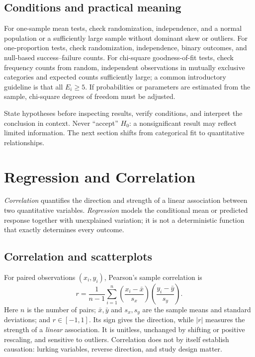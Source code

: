 \documentclass[11pt]{article}
\begin{document}
\subsection{Conditions and practical meaning}
For one-sample mean tests, check randomization, independence, and a normal
population or a sufficiently large sample without dominant skew or outliers.
For one-proportion tests, check randomization, independence, binary outcomes,
and null-based success--failure counts.  For chi-square goodness-of-fit tests,
check frequency counts from random, independent observations in mutually
exclusive categories and expected counts sufficiently large; a common
introductory guideline is that all $E_i\ge5$.  If probabilities or parameters
are estimated from the sample, chi-square degrees of freedom must be adjusted.

\begin{keybox}
State hypotheses before inspecting results, verify conditions, and interpret
the conclusion in context.  Never ``accept'' $H_0$: a nonsignificant result
may reflect limited information.  The next section shifts from categorical
fit to quantitative relationships.
\end{keybox}

\section{Regression and Correlation}\label{sec:regression}
\emph{Correlation} quantifies the direction and strength of a linear
association between two quantitative variables.  \emph{Regression} models the
conditional mean or predicted response together with unexplained variation;
it is not a deterministic function that exactly determines every outcome.

\subsection{Correlation and scatterplots}
For paired observations $(x_i,y_i)$, Pearson's sample correlation is
\begin{equation}\label{eq:r}
r=\frac{1}{n-1}\sum_{i=1}^{n}
\left(\frac{x_i-\bar{x}}{s_x}\right)
\left(\frac{y_i-\bar{y}}{s_y}\right).
\end{equation}
Here $n$ is the number of pairs; $\bar{x},\bar{y}$ and $s_x,s_y$ are the
sample means and standard deviations; and $r\in[-1,1]$.  Its sign gives the
direction, while $|r|$ measures the strength of a \emph{linear} association.
It is unitless, unchanged by shifting or positive rescaling, and sensitive to
outliers.  Correlation does not by itself establish causation: lurking
variables, reverse direction, and study design matter.
\end{document}
